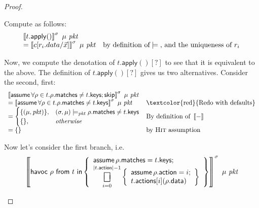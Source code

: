 \documentclass{article}
\newcommand{\pkt}{\mathit{pkt}}
\newcommand{\denote}[1]{\left\llbracket#1\right\rrbracket}
\newcommand{\matches}{\mathsf{matches}}
\newcommand{\action}{\mathsf{action}}
\newcommand{\actions}{\mathsf{actions}}
\newcommand{\keys}{\mathsf{keys}}
\newcommand{\data}{\mathsf{data}}
\newcommand{\assume}{\mathop{\mathsf{assume}}}
\newcommand{\apply}{\mathsf{apply}}
\newcommand{\choiceop}{\rotatebox[origin=c]{90}{$\sqsubset\!\!\!\sqsupset$}}
\DeclareMathOperator*{\bigchoice}{\scalerel*{\choiceop}{\sum}}
\renewcommand{\choose}[2]{\mathop{\mathsf{havoc}~#1~\mathsf{from}~#2~\mathsf{in}}}
\newcommand{\SKIP}{\mathsf{skip}}
\newcommand{\satisfy}[3]{({#1,#3}) \models_{#2}}
\begin{document}
\begin{proof}
\begin{enumerate}[align=left]
\begin{enumerate}
      Compute as follows:
      \[\begin{array}{>{\displaystyle}ll}
      \denote{t.\apply()}^\sigma~\mu~\pkt \\
      = \denote{c[r_i.data/\vec x]}^\sigma~\mu~\pkt & \text{by definition of} \models \text{, and the uniqueness of }r_i  \\
      \end{array}
      \]

      Now, we compute the denotation of $t.\apply()[?]$ to see that it is equivalent to the above.
      The definition of $t.\apply()[?]$ gives us two alternatives. Consider the second, first:
      \[\begin{array}{>{\displaystyle}ll}
        \denote{\assume \forall \rho \in t. \rho.\matches \neq t.\keys;\SKIP}^\sigma~\mu~\pkt \\
        = \denote{\assume \forall \rho \in t. \rho.\matches \neq t.\keys}^\sigma~\mu~\pkt
        & \textrm{\textcolor{red}{Redo with defaults}} \\
        = \begin{cases}
          \{(\mu,\pkt)\}, & \satisfy\sigma\pkt\mu \rho.\matches \neq t.\keys \\
          \{\}, &\textit{otherwise}
        \end{cases}
        & \textrm{By definition of }\denote{-}\\
        =  \{\}
        & \textrm{by \textsc{Hit} assumption}
      \end{array}
      \]

      Now let's consider the first branch, i.e.
      \[
      \denote{\choose \rho t \left\{
        \begin{array}{>{\displaystyle}l}
          \assume \rho.\matches = t.\keys;\\
          \bigchoice_{i=0}^{|t.\action| -1}
          \left\{\begin{array}{l}
          \assume \rho.\action = i;\\
          t.\actions[i](\rho.\data)
          \end{array}\right\}
        \end{array}\right\}
      }^\sigma~\mu~\pkt\]


\end{enumerate}
\end{enumerate}
\end{proof}
\end{document}

